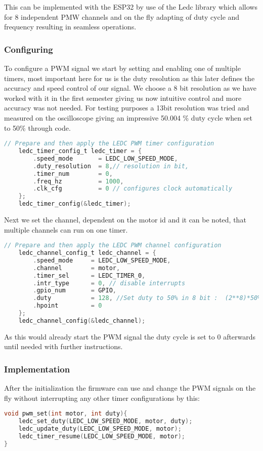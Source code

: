\documentclass[../report.tex]{subfiles}
\begin{document}
This can be implemented with the ESP32 by use of the Ledc library which allows 
for 8 independent PMW channels and on the fly adapting of duty cycle and frequency
resulting in seamless operations. 

\subsubsection{Configuring}
To configure a PWM signal we start by setting and enabling one of multiple timers,
most important here for us is the duty resolution as this later defines the accuracy 
and speed control of our signal. We choose a 8 bit resolution as we have worked with 
it in the first semester giving us now intuitive control and more accuracy was not needed. 
For testing purposes a 13bit resolution was tried and measured on the oscilloscope 
giving an impressive 50.004 \% duty cycle when set to 50\% through code.
\begin{lstlisting}[language=c, caption={Timer config}]
    // Prepare and then apply the LEDC PWM timer configuration
    ledc_timer_config_t ledc_timer = {
        .speed_mode       = LEDC_LOW_SPEED_MODE,
        .duty_resolution  = 8,// resolution in bit, 
        .timer_num        = 0, 
        .freq_hz          = 1000,
        .clk_cfg          = 0 // configures clock automatically 
    };
    ledc_timer_config(&ledc_timer);
\end{lstlisting}
Next we set the channel, dependent on the motor id and it can be noted, that multiple 
channels can run on one timer.
\begin{lstlisting}[language=c, caption={Channel config}]
    // Prepare and then apply the LEDC PWM channel configuration
    ledc_channel_config_t ledc_channel = {
        .speed_mode     = LEDC_LOW_SPEED_MODE, 
        .channel        = motor,
        .timer_sel      = LEDC_TIMER_0,
        .intr_type      = 0, // disable interrupts
        .gpio_num       = GPIO,
        .duty           = 128, //Set duty to 50% in 8 bit :  (2**8)*50% = 128
        .hpoint         = 0
    };
    ledc_channel_config(&ledc_channel);
\end{lstlisting}
As this would already start the PWM signal the duty cycle is set to 0 afterwards until needed with further 
instructions.
\subsubsection{Implementation}
After the initialization the firmware can use and change the PWM signals on the fly without interrupting
any other timer configurations by this: 
\begin{lstlisting}[language=c, caption={PWM Implementation}]
void pwm_set(int motor, int duty){
    ledc_set_duty(LEDC_LOW_SPEED_MODE, motor, duty);  
    ledc_update_duty(LEDC_LOW_SPEED_MODE, motor); 
    ledc_timer_resume(LEDC_LOW_SPEED_MODE, motor);
}
\end{lstlisting}
\end{document}
